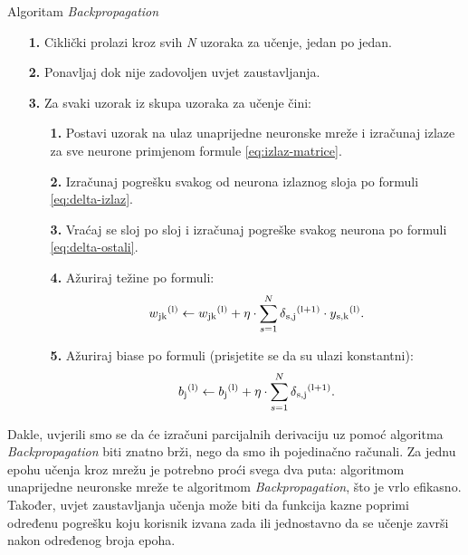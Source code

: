\documentclass[times, utf8, zavrsni]{fer}
\begin{document}
\begin{algorithm}
\caption{Algoritam \textit{Backpropagation}\footnotemark}
\label{algo:alg-backprop}
    \begin{enumerate}
        \item[\textbf{1.}] Ciklički prolazi kroz svih \textit{N} uzoraka za učenje, jedan po jedan.
        \item[\textbf{2.}] Ponavljaj dok nije zadovoljen uvjet zaustavljanja.
        \item[\textbf{3.}] Za svaki uzorak iz skupa uzoraka za učenje čini:
        \begin{enumerate}
            \item[\textbf{1.}] Postavi uzorak na ulaz unaprijedne neuronske mreže i izračunaj izlaze za sve neurone primjenom formule \eqref{eq:izlaz-matrice}.
            \item[\textbf{2.}] Izračunaj pogrešku svakog od neurona izlaznog sloja po formuli \eqref{eq:delta-izlaz}.
            \item[\textbf{3.}] Vraćaj se sloj po sloj i izračunaj pogreške svakog neurona po formuli \eqref{eq:delta-ostali}.
            \item[\textbf{4.}] Ažuriraj težine po formuli:
                \begin{equation}
                    \label{eq:azuriranje}
                    w\textsubscript{jk}\textsuperscript{(l)} \leftarrow w\textsubscript{jk}\textsuperscript{(l)} + \eta\cdot\sum\limits_{s=1}^N \delta\textsubscript{s,j}\textsuperscript{(l+1)} \cdot y\textsubscript{s,k}\textsuperscript{(l)}.
                \end{equation}
            \item[\textbf{5.}] Ažuriraj biase po formuli (prisjetite se da su ulazi konstantni):
                \begin{equation}
                    \label{eq:azuriranje-bias}
                    b\textsubscript{j}\textsuperscript{(l)} \leftarrow b\textsubscript{j}\textsuperscript{(l)} + \eta\cdot\sum\limits_{s=1}^N \delta\textsubscript{s,j}\textsuperscript{(l+1)}.
                \end{equation}
        \end{enumerate}
    \end{enumerate}
\end{algorithm}

\newpage
Dakle, uvjerili smo se da će izračuni parcijalnih derivaciju uz pomoć algoritma \textit{Backpropagation} biti znatno brži, nego da smo ih pojedinačno računali. Za jednu epohu učenja kroz mrežu je potrebno proći svega dva puta: algoritmom unaprijedne neuronske mreže te algoritmom \textit{Backpropagation}, što je vrlo efikasno. Također, uvjet zaustavljanja učenja može biti da funkcija kazne poprimi određenu pogrešku koju korisnik izvana zada ili jednostavno da se učenje završi nakon određenog broja epoha.
\end{document}
